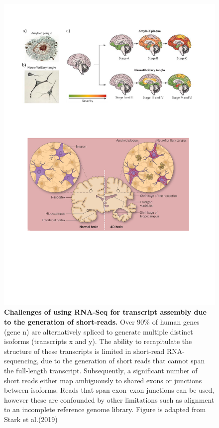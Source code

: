 \begin{landscape}
	\begin{figure}[htp]
		\centering
		\includegraphics[page=10,trim={0 19cm 2cm 1cm},clip, scale = 1]{Figures/Introduction_Figures.pdf}
		\captionsetup{width=1.2\textwidth}
		\caption[Challenges of using short-reads for transcript assembly]%
		{\textbf{Challenges of using RNA-Seq for transcript assembly due to the generation of short-reads.} Over 90\% of human genes (gene n) are alternatively spliced to generate multiple distinct isoforms (transcripts x and y). The ability to recapitulate the structure of these transcripts is limited in short-read RNA-sequencing, due to the generation of short reads that cannot span the full-length transcript. Subsequently, a significant number of short reads either map ambiguously to shared exons or junctions between isoforms. Reads that span exon–exon junctions can be used, however these are confounded by other limitations such as alignment to an incomplete reference genome library. Figure is adapted from Stark et al.(2019) \cite{Stark2019}}
		\label{fig:rna_seq_limitations}
	\end{figure}
\end{landscape}


